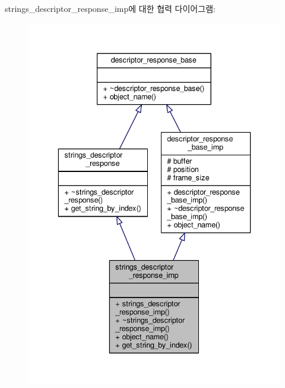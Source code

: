 strings\+\_\+descriptor\+\_\+response\+\_\+imp에 대한 협력 다이어그램\+:
\nopagebreak
\begin{figure}[H]
\begin{center}
\leavevmode
\includegraphics[width=336pt]{classavdecc__lib_1_1strings__descriptor__response__imp__coll__graph}
\end{center}
\end{figure}

